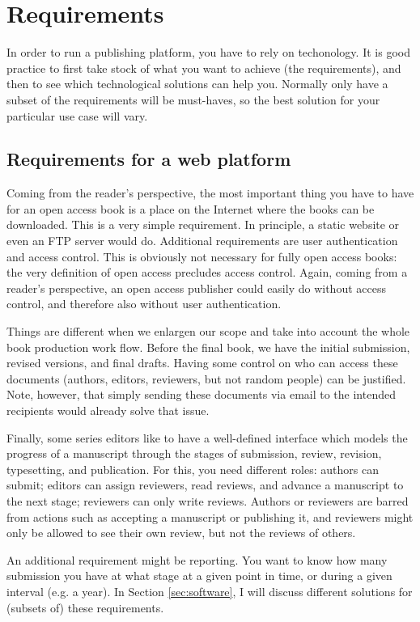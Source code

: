 \documentclass[guidelines,nonflat,modfonts] {langsci/langscibook}
\begin{document}
                    
\section{Requirements}
In order to run a publishing platform, you have to rely on techonology. It is good practice to first take stock of what you want to achieve (the requirements), and then to see which technological solutions can help you. Normally only have a subset of the requirements will be must-haves, so the best solution for your particular use case will vary.

\subsection{Requirements for a web platform}
Coming from the reader's perspective, the most important thing you have to have for an open access book is a place on the Internet where the books can be downloaded. This is a very simple requirement. In principle, a static website or even an FTP server would do. Additional requirements are user authentication and access control. This is obviously not necessary for fully open access books: the very definition of open access precludes access control. Again, coming from a reader's perspective, an open access publisher could easily do without access control, and therefore also without user authentication. 

Things are different when we enlargen our scope and take into account the whole book production work flow. Before the final book, we have the initial submission, revised versions, and final drafts. Having some control on who can access these documents (authors, editors, reviewers, but not random people) can be justified. Note, however, that simply sending these documents via email to the intended recipients would already solve that issue.

Finally, some series editors like to have a well-defined interface which models the progress of a manuscript through the stages of submission, review, revision, typesetting, and publication. For this, you need different roles: authors can submit; editors can assign reviewers, read reviews, and advance a manuscript to the next stage; reviewers can only write reviews. Authors or reviewers are barred from actions such as accepting a manuscript or publishing it, and reviewers might only be allowed to see their own review, but not the reviews of others. 

An additional requirement might be reporting. You want to know how many submission you have at what stage at a given point in time, or during a given interval (e.g. a year). In Section \ref{sec:software}, I will discuss different solutions for (subsets of) these requirements. 
 
\end{document}
